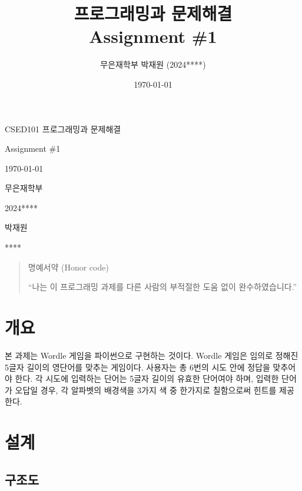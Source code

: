 \documentclass{article}
\title{프로그래밍과 문제해결 \\ Assignment \#1}
\author{무은재학부 박재원 (2024****)}
\date{\today}
\begin{document}
\begin{titlepage}
	\centering
	{\huge CSED101 프로그래밍과 문제해결\par}
	\vspace{0.5cm}
	{\LARGE Assignment \#1\par}
	\vspace{0.5cm}
	{\large \today\par}
	\vfill
  
  \begin{multicols}{2}
    \vphantom{}
    \columnbreak
  {
    \Large 
    \begin{description}[nosep, align=right, labelwidth=\widthof{00000000000000000}]
      \item[학과] 무은재학부
      \item[학번] 2024****
      \item[이름] 박재원
      \item[POVIS ID] ****
    \end{description}
  }
  \end{multicols}

  \vspace{1cm}


  \begin{quote}
    명예서약 (Honor code)

    ``나는 이 프로그래밍 과제를 다른 사람의 부적절한 도움 없이 완수하였습니다.''
  \end{quote}

\end{titlepage}

\tableofcontents

\section{개요}

본 과제는 Wordle 게임을 파이썬으로 구현하는 것이다.
Wordle 게임은 임의로 정해진 5글자 길이의 영단어를 맞추는 게임이다.
사용자는 총 6번의 시도 안에 정답을 맞추어야 한다.
각 시도에 입력하는 단어는 5글자 길이의 유효한 단어여야 하며,
입력한 단어가 오답일 경우, 각 알파벳의 배경색을 3가지 색 중 한가지로 칠함으로써 힌트를 제공한다.

\section{설계}

\subsection{구조도}
\end{document}
